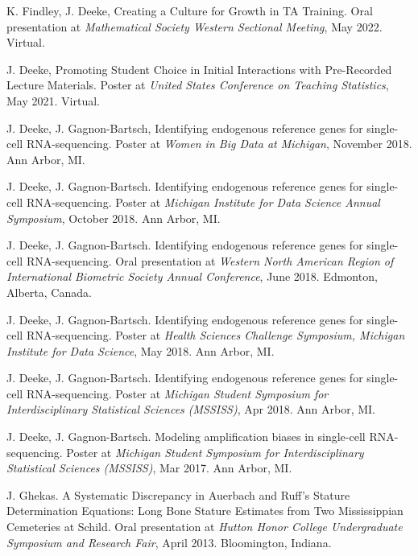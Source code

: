 \documentclass[10pt]{article}
\begin{document}
K. Findley, J. Deeke, Creating a Culture for Growth in TA Training. Oral presentation at \textit{Mathematical Society Western Sectional Meeting}, May 2022. Virtual.
\vspace{2mm}

J. Deeke, Promoting Student Choice in Initial Interactions with Pre-Recorded Lecture Materials. Poster at \textit{United States Conference on Teaching Statistics}, May 2021. Virtual.
\vspace{2mm} 

J. Deeke, J. Gagnon-Bartsch, Identifying endogenous reference genes for single-cell RNA-sequencing. Poster at \textit{Women in Big Data at Michigan}, November 2018. Ann Arbor, MI.
\vspace{2mm}

J. Deeke, J. Gagnon-Bartsch. Identifying endogenous reference genes for single-cell RNA-sequencing. Poster at \textit{Michigan Institute for Data Science Annual Symposium}, October 2018. Ann Arbor, MI.
\vspace{2mm}

J. Deeke, J. Gagnon-Bartsch. Identifying endogenous reference genes for single-cell RNA-sequencing. Oral presentation at \textit{Western North American Region of International Biometric Society Annual Conference}, June 2018. Edmonton, Alberta, Canada. 
\vspace{2mm}

J. Deeke, J. Gagnon-Bartsch. Identifying endogenous reference genes for single-cell RNA-sequencing. Poster at \textit{Health Sciences Challenge Symposium, Michigan Institute for Data Science}, May 2018. Ann Arbor, MI.
\vspace{2mm}

J. Deeke, J. Gagnon-Bartsch. Identifying endogenous reference genes for single-cell RNA-sequencing. Poster at \textit{Michigan Student Symposium for Interdisciplinary Statistical Sciences (MSSISS)}, Apr 2018. Ann Arbor, MI. 
\vspace{2mm}

J. Deeke, J. Gagnon-Bartsch. Modeling amplification biases in single-cell RNA-sequencing. Poster at \textit{Michigan Student Symposium for Interdisciplinary Statistical Sciences (MSSISS)}, Mar 2017. Ann Arbor, MI. 
\vspace{2mm}

J. Ghekas. A Systematic Discrepancy in Auerbach and Ruff's Stature Determination Equations: Long Bone Stature Estimates from Two Mississippian Cemeteries at Schild. Oral presentation at \textit{Hutton Honor College Undergraduate Symposium and Research Fair}, April 2013. Bloomington, Indiana.
\vspace{2mm}
\end{document}

